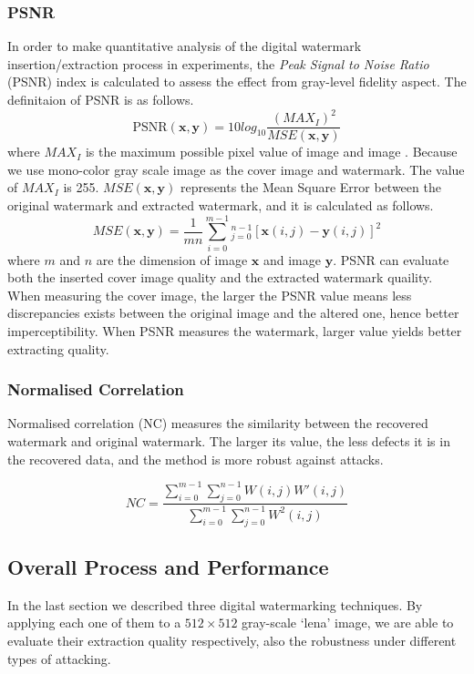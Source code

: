 \subsubsection{PSNR}
In order to make quantitative analysis of the digital watermark insertion/extraction process in experiments, the\textit{ Peak Signal to Noise Ratio} (PSNR) index is calculated to assess the effect from gray-level fidelity aspect. The definitaion of PSNR is as follows.
\begin{equation}
    \text{PSNR}(\mathbf{x,y}) = 10log_{10}\frac{(MAX_I)^2}{MSE(\mathbf{x,y})} 
\end{equation}
where $MAX_I$ is the maximum possible pixel value of image  and image . Because we use mono-color gray scale image as the cover image and watermark. The value of $MAX_I$ is 255. $MSE(\mathbf{x,y})$ represents the Mean Square Error between the original watermark and extracted watermark, and it is calculated as follows.
\begin{equation}
    MSE(\mathbf{x,y}) =  \frac{1}{mn}\sum_{i=0}^{m-1}_{j=0}^{n-1}[\mathbf{x}(i,j) - \mathbf{y}(i,j)]^2
\end{equation}
where $m$ and $n$ are the dimension of image $\mathbf{x}$ and image $\mathbf{y}$. PSNR can evaluate both the inserted cover image quality and the extracted watermark quaility. When measuring the cover image, the larger the PSNR value means less discrepancies exists between the original image and the altered one, hence better imperceptibility. When PSNR measures the watermark, larger value yields better extracting quality.

\subsubsection{Normalised Correlation}
Normalised correlation (NC) measures the similarity between the recovered watermark and original watermark. The larger its value, the less defects it is in the recovered data, and the method is more robust against attacks.

\begin{equation}
    NC =  \frac{\sum_{i=0}^{m-1} \sum_{j=0}^{n-1}W(i,j) W'(i,j)} {\sum_{i=0}^{m-1} \sum_{j=0}^{n-1} W^2(i,j)}
\end{equation}


\subsection{Overall Process and Performance}
In the last section we described three digital watermarking techniques. By applying each one of them to a $512 \times 512$ gray-scale `lena' image, we are able to evaluate their extraction quality respectively, also the robustness under different types of attacking.  

